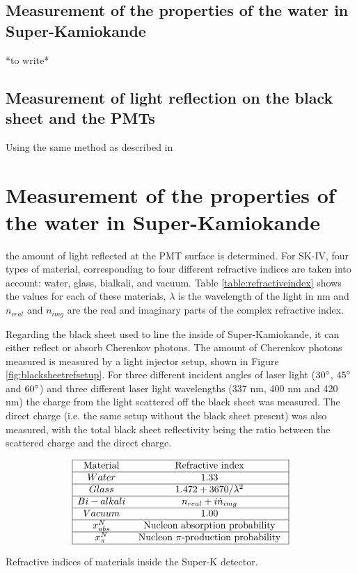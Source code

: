 \subsection{Measurement of the properties of the water in Super-Kamiokande}
*to write*

\subsection{Measurement of light reflection on the black sheet and the PMTs} 

Using the same method as described in \section{Measurement of the properties of the water in Super-Kamiokande} the amount of light reflected at the PMT surface is determined. For SK-IV, four types of material, corresponding to four different refractive indices are taken into account: water, glass, bialkali, and vacuum. Table \ref{table:refractiveindex} shows the values for each of these materials, $\lambda$ is the wavelength of the light in nm and $n_{real}$ and $n_{img}$ are the real and imaginary parts of the complex refractive index.

Regarding the black sheet used to line the inside of Super-Kamiokande, it can either reflect or absorb Cherenkov photons. The amount of Cherenkov photons measured is measured by a light injector setup, shown in Figure \ref{fig:blacksheetrefsetup}. For three different incident angles of laser light ($30 \degree$, $45 \degree$ and $60 \degree$) and three different laser light wavelengths (337 nm, 400 nm and 420 nm) the charge from the light scattered off the black sheet was measured. The direct charge (i.e. the same setup without the black sheet present) was also measured, with the total black sheet reflectivity being the ratio between the scattered charge and the direct charge.

\begin{table}[H]
    $$
    \begin{array}{|cc|}
    \hline \text{Material} & \text{Refractive index} \\
    \hline Water & 1.33 \\
    \hline Glass & 1.472+3670/\lambda^{2} \\
    \hline Bi-alkali & n_{real} + i \dot n_{img} \\
    \hline Vacuum & 1.00 \\
    \hline x_{a b s}^{N} & \text { Nucleon absorption probability }  \\
    \hline x_{\pi}^{N} & \text { Nucleon } \pi \text {-production probability }\\
    \hline

    
    \end{array}
    $$
    \caption{Refractive indices of materials inside the Super-K detector.} 
    \label{table:refractiveindex}
    \end{table}
    

